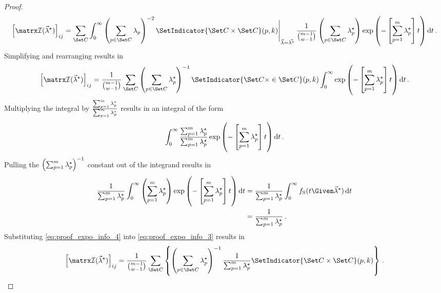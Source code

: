 \documentclass[../main.tex]{subfiles}
\begin{document}
\begin{proof}
\begin{equation}
    \left [ \infomatrx(\tparam{\vec\lambda}) \right ]_{i j} =
    \sum_{\cand}
    \int_{0}^{\infty}
    \eval{
        \left ( \sum_{p \in \cand} \lambda_p \right )^{-2} \SetIndicator{\cand \times \cand}(p,k)
    }_{\vec\lambda = \vec{\tparam\lambda}}
    \frac{1}{\binom{m-1}{w-1}}
    \left ( \sum_{p \in \cand} \tparam\lambda_p \right ) \exp \left ( - \left [ \sum_{p=1}^{m} \tparam\lambda_p \right ] t \right )
     \dif t\,.
\end{equation}
Simplifying and rearranging results in
\begin{equation}
\label{eq:proof_expo_info_3}
    \left [ \infomatrx(\tparam{\vec\lambda}) \right ]_{i j} =
    \frac{1}{\binom{m-1}{w-1}}
    \sum_{\cand}
    \left ( \sum_{p \in \cand} \tparam\lambda_p \right )^{-1}
    \SetIndicator{\cand \times \in \cand}(p,k)
    \int_{0}^{\infty}
    \exp \left ( - \left [ \sum_{p=1}^{m} \tparam\lambda_p \right ] t \right ) 
     \dif t\,.
\end{equation}
Multiplying the integral by $\frac{\sum_{p=1}^{m} {\lambda}^{\star}_p}{\sum_{p=1}^{m} {\lambda}^{\star}_p}$ results in an integral of the form
\begin{equation}
    \int_{0}^{\infty} \frac{\sum_{p=1}^{m} \tparam\lambda_p}{\sum_{p=1}^{m} \tparam\lambda_p} \exp \left ( - \left [ \sum_{p=1}^{m} \tparam\lambda_p \right ] t \right ) 
     \dif t\,.
\end{equation}
Pulling the $\left(\sum_{p=1}^{m} {\lambda}^{\star}_p\right)^{-1}$ constant out of the integrand results in
\begin{align}
    \frac{1}{\sum_{p=1}^{m} \tparam\lambda_p} \int_{0}^{\infty}
    \left ( \sum_{p=1}^{m} \tparam\lambda_p \right ) \exp \left ( - \left [ \sum_{p=1}^{m} \tparam\lambda_p \right ] t \right ) \dif t
    &= \frac{1}{\sum_{p=1}^{m} \tparam\lambda_p} \int_{0}^{\infty}
    \spdf(t \Given \tparam{\vec\lambda}) \dif t\\
\label{eq:proof_expo_info_4}
    &= \frac{1}{\sum_{p=1}^{m} \tparam\lambda_p}\,.
\end{align}
Substituting \cref{eq:proof_expo_info_4} into \cref{eq:proof_expo_info_3} results in
\begin{equation}
\label{eq:proof_expo_info_5}
    \left [ \infomatrx(\tparam{\vec\lambda}) \right ]_{i j} =
    \frac{1}{\binom{m-1}{w-1}}
    \sum_{\cand} \left\{
    \left ( \sum_{p \in \cand} \tparam\lambda_p \right )^{-1}
    \frac{1}{\sum_{p=1}^{m} \tparam\lambda_p} \SetIndicator{\cand \times \cand}(p,k) \right \}\,.
\end{equation}
\end{proof}
\end{document}
